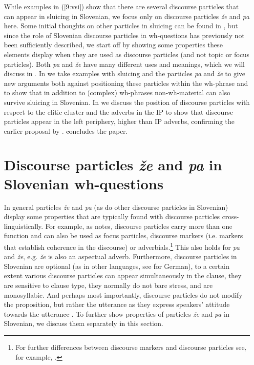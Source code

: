 \documentclass[output=paper,
modfonts,
newtxmath,
hidelinks
]{langscibook}
\begin{document}
\noindent While examples in (\ref{9:vsi}) show that there are several discourse particles that can appear in sluicing in Slovenian, we focus only on discourse particles \textit{že} and \textit{pa} here. Some initial thoughts on other particles in sluicing can be found in \cite{marusicetal2015}, but since the role of Slovenian discourse particles in wh-questions has previously not been sufficiently described, we start off by showing some properties these elements display when they are used as discourse particles (and not topic or focus particles). Both \textit{pa} and \textit{že} have many different uses and meanings, which we will discuss in . In  we take examples with sluicing and the particles \textit{pa} and \textit{že} to give new arguments both against positioning these particles within the wh-phrase and to show that in addition to (complex) wh-phrases non-wh-material can also survive sluicing in Slovenian. In  we discuss the position of discourse particles with respect to the  clitic cluster and the adverbs in the IP to show that discourse particles appear in the left periphery, higher than IP adverbs, confirming the earlier proposal by \cite{marusicetal2015}.  concludes the paper.


\section{Discourse particles \textit{že} and \textit{pa} in Slovenian wh-questions}\label{9:s2}

In general particles \textit{že} and \textit{pa} (as do other discourse particles in Slovenian) display some properties that are typically found with discourse particles cross-lingui\-sti\-cal\-ly. For example, as \cite{zimmermann2011} notes, discourse particles carry more than one function and can also be used as focus particles, discourse markers (i.e. markers that establish coherence in the discourse) or adverbials.\footnote{For further differences between discourse markers and discourse particles see, for example, \cite{zimmermann2011}.} This also holds for \textit{pa} and \textit{že}, e.g. \textit{že} is also an aspectual adverb. Furthermore, discourse particles in Slovenian are optional (as in other languages, see \citealt{bayerobenauer2011} for German), to a certain extent various discourse particles can appear simultaneously in the clause, they are sensitive to clause type, they normally do not bare stress, and are monosyllabic. And perhaps most importantly, discourse particles do not modify the proposition, but rather the utterance \citep{bayerobenauer2011} as they express speakers' attitude towards the utterance \citep{zimmermann2011}. To further show properties of particles \textit{že} and \textit{pa} in Slovenian, we discuss them separately in this section. 
\end{document}
